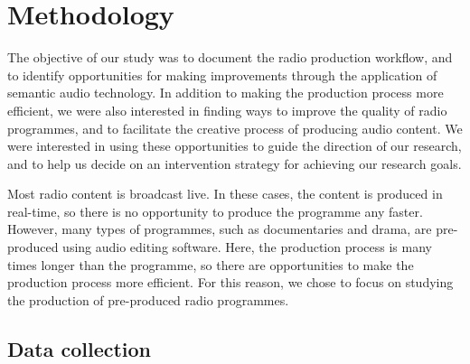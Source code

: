 
\section{Methodology}\label{sec:ethno-method}


The objective of our study was to document the radio production workflow, and to identify opportunities for making
improvements through the application of semantic audio technology.  In addition to making the production process more
efficient, we were also interested in finding ways to improve the quality of radio programmes, and to facilitate the
creative process of producing audio content.  We were interested in using these opportunities to guide the direction of
our research, and to help us decide on an intervention strategy for achieving our research goals. 

Most radio content is broadcast live. In these cases, the content is produced in real-time, so there is no opportunity
to produce the programme any faster. However, many types of programmes, such as documentaries and drama, are
pre-produced using audio editing software. Here, the production process is many times longer than the programme, so
there are opportunities to make the production process more efficient.  For this reason, we chose to focus on studying
the production of pre-produced radio programmes.

\subsection{Data collection}


